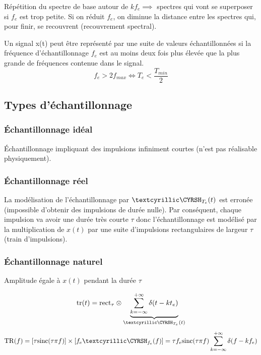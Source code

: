 \documentclass[a4paper,12pt]{article}
\begin{document}
Répétition du spectre de base autour de $kf_e \implies$ spectres qui vont se superposer si $f_e$ est trop petite. Si on réduit $f_e$, on diminue la distance entre les spectres qui, pour finir, se recouvrent (recouvrement spectral).

\begin{defi}
    Un signal x(t) peut être représenté par une suite de valeurs échantillonnées si la fréquence d'échantillonnage $f_e$ est au moins deux fois plus élevée que la plus grande de fréquences contenue dans le signal.
    \[ f_e > 2f_{max} \Leftrightarrow T_e < \dfrac{T_{min}}{2} \]
\end{defi}

\subsection{Types d'échantillonnage}

\subsubsection{Échantillonnage idéal}

Échantillonnage impliquant des impulsions infiniment courtes (n'est pas réalisable physiquement).

\subsubsection{Échantillonnage réel}

La modélisation de l'échantillonnage par $\dirac_{T_e}(t)$ est erronée (impossible d'obtenir des impulsions de durée nulle). Par conséquent, chaque impulsion va avoir une durée très courte $\tau$ donc l'échantillonnage est modélisé par la multiplication de $x(t)$ par une suite d'impulsions rectangulaires de largeur $\tau$ (train d'impulsions).

\subsubsection{Échantillonnage naturel}

Amplitude égale à $x(t)$ pendant la durée $\tau$

\[ \mathrm{tr}(t) = \mathrm{rect}_\tau \otimes \underbrace{\sum_{k=-\infty}^{+\infty} \delta(t-kt_e)}_{\dirac_{T_e}(t)} \]
\[ \mathrm{TR}(f) = [\tau \mathrm{sinc}(\tau \pi f)] \times [f_e \dirac_{f_e}(f)] = \tau f_e \mathrm{sinc}(\tau \pi f) \sum_{k=-\infty}^{+\infty} \delta(f-kf_e) \]
\end{document}
